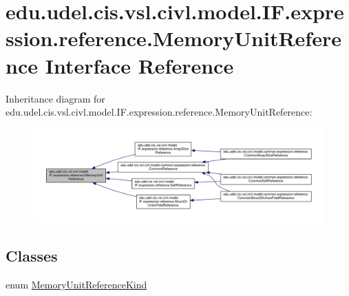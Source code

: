 \hypertarget{interfaceedu_1_1udel_1_1cis_1_1vsl_1_1civl_1_1model_1_1IF_1_1expression_1_1reference_1_1MemoryUnitReference}{}\section{edu.\+udel.\+cis.\+vsl.\+civl.\+model.\+I\+F.\+expression.\+reference.\+Memory\+Unit\+Reference Interface Reference}
\label{interfaceedu_1_1udel_1_1cis_1_1vsl_1_1civl_1_1model_1_1IF_1_1expression_1_1reference_1_1MemoryUnitReference}


Inheritance diagram for edu.\+udel.\+cis.\+vsl.\+civl.\+model.\+I\+F.\+expression.\+reference.\+Memory\+Unit\+Reference\+:
\nopagebreak
\begin{figure}[H]
\begin{center}
\leavevmode
\includegraphics[width=350pt]{interfaceedu_1_1udel_1_1cis_1_1vsl_1_1civl_1_1model_1_1IF_1_1expression_1_1reference_1_1MemoryUnitReference__inherit__graph}
\end{center}
\end{figure}
\subsection*{Classes}
\begin{DoxyCompactItemize}
\item 
enum \hyperlink{enumedu_1_1udel_1_1cis_1_1vsl_1_1civl_1_1model_1_1IF_1_1expression_1_1reference_1_1MemoryUnitRef64a306b012808a0db442488810ff9534}{Memory\+Unit\+Reference\+Kind}
\end{DoxyCompactItemize}
